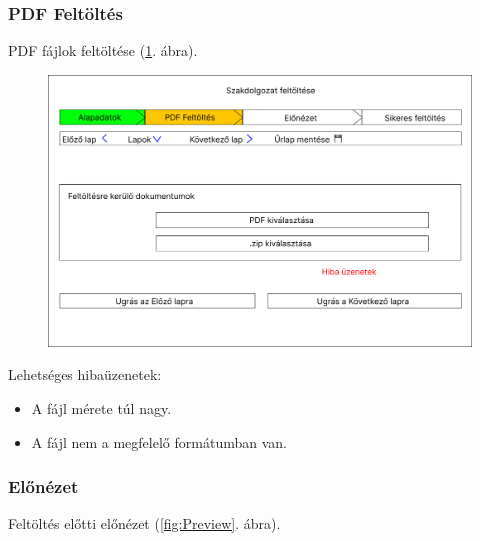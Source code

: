 \documentclass[a4paper,12pt]{article}
\begin{document}
\subsubsection{PDF Feltöltés}

PDF fájlok feltöltése (\ref{fig:PDF_Upload}. ábra).

\begin{figure}
	\centering
	\includegraphics[width=\textwidth]{images/Web_pages/PDF_Upload.jpg}
	\caption{}
	\label{fig:PDF_Upload}
\end{figure}

Lehetséges hibaüzenetek:
\begin{itemize}
	\item A fájl mérete túl nagy.
	\item A fájl nem a megfelelő formátumban van.
\end{itemize}

\subsubsection{Előnézet}

Feltöltés előtti előnézet (\ref{fig:Preview}. ábra).
\end{document}
